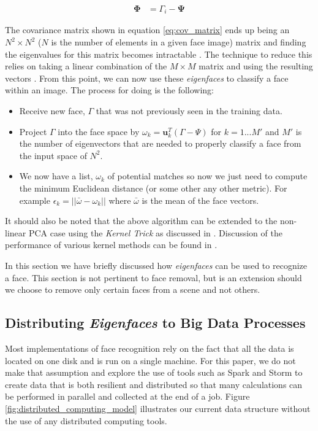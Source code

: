 \documentclass[
	submission,
	final,
	notitlepage,
	narroweqnarray,
	inline,
	twoside,
	]{ieee}
\begin{document}
\begin{align}
  \mathbf{\Phi} &= \Gamma_i - \mathbf{\Psi} \label{eq:subtract_bias}
\end{align}

The covariance matrix shown in equation \ref{eq:cov_matrix} ends up
being an $N^2 \times N^2$ ($N$ is the number of elements in a given 
face image) matrix and finding the eigenvalues for 
this matrix becomes intractable \cite{eigen_face_recognition}. The 
technique to reduce this relies on taking a linear combination of the 
$M \times M$ matrix and using the resulting vectors \cite{turk_eigen_faces}.
From this point, we can now use these \textit{eigenfaces} to classify
a face within an image. The process for doing is the following: 
\begin{itemize}
  \item Receive new face, $\Gamma$ that was not previously seen in the
    training data. 
  \item Project $\Gamma$ into the face space by $\omega_k = \mathbf{u}_k^T (\Gamma - \Psi)$
    for $k = 1 ... M'$ and $M'$ is the number of eigenvectors that are 
    needed to properly classify a face from the input space of $N^2$.
  \item We now have a list, $\omega_k$ of potential matches so now we just need
    to compute the minimum Euclidean distance (or some other any other metric). 
    For example $\epsilon_k = ||\bar{\omega} - \omega_k ||$ where $\bar{\omega}$
    is the mean of the face vectors. 
\end{itemize}

It should also be noted that the above algorithm can be extended to the non-linear
PCA case using the \textit{Kernel Trick} as discussed in \cite{face_kpca}. 
Discussion of the performance of various kernel methods can be found in 
\cite{kernel_learning}.

In this section we have briefly discussed how \textit{eigenfaces} can be
used to recognize a face. This section is not pertinent to face removal, 
but is an extension should we choose to remove only certain faces from 
a scene and not others. 

\subsection{Distributing \textit{Eigenfaces} to Big Data Processes}
Most implementations of face recognition rely on the fact that
all the data is located on one disk and is run on a single machine. 
For this paper, we do not make that assumption and explore the use
of tools such as Spark \cite{spark} and Storm \cite{storm} to create
data that is both resilient and distributed so that many 
calculations can be performed in parallel and collected at the end of a job. 
Figure \ref{fig:distributed_computing_model} 
illustrates our current data structure without the use of any
distributed computing tools.
\end{document}

